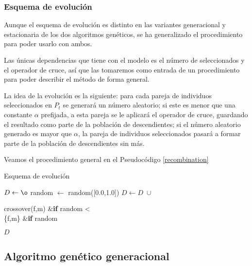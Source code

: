 \documentclass[a4paper, 11pt, titlepage]{article}
\begin{document}
    \subsubsection*{Esquema de evolución}

    Aunque el esquema de evolución es distinto en las variantes generacional y estacionaria de los dos algoritmos genéticos, se ha generalizado el procedimiento para poder usarlo con ambos.

    Las únicas dependencias que tiene con el modelo es el número de seleccionados y el operador de cruce, así que las tomaremos como entrada de un procedimiento para poder describir el método de forma general.

    La idea de la evolución es la siguiente: para cada pareja de individuos seleccionados en $P_t$ se generará un número aleatorio; si este es menor que una constante $\alpha$ prefijada, a esta pareja se le aplicará el operador de cruce, guardando el resultado como parte de la población de descendientes; si el número aleatorio generado es mayor que $\alpha$, la pareja de individuos seleccionados pasará a formar parte de la población de descendientes sin más.

    Veamos el procedimiento general en el Pseudocódigo \ref{recombination}

    \begin{algorithm}
        \caption{Esquema de evolución}\label{recombination}
        \begin{algorithmic}[1]
             
            \State $D \gets \o$ 
             
                \State random $\gets$ random([0.0,1.0])
                \State $D \gets D\; \cup$ \begin{cases}
                    crossover(f,m) &\textrm{\textbf{if} } random < \alpha \\
                    \{f,m\} &\textrm{\textbf{if} } random \geq \alpha
                \end{cases}
            \EndFor
            \State \Return $D$
            \EndFunction
        \end{algorithmic}
    \end{algorithm}


    \subsection{Algoritmo genético generacional}
\end{document}
